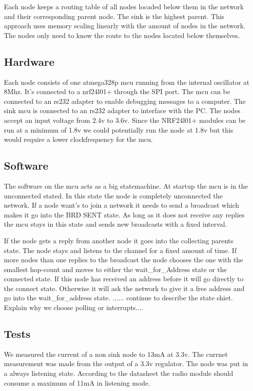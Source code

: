 \documentclass[a4paper,11pt]{article}
\begin{document}
Each node keeps a routing table of all nodes locaded below them in the
network and their corresponding parent node. The sink is the highest
parent. This approach uses memory scaling linearly with the amount of
nodes in the network. The nodes only need to know the route to the
nodes located below themselves.

\subsection{Hardware}
Each node consists of one atmega328p mcu running from the
internal oscillator at 8Mhz. It's connected to a nrf24l01+ through the
SPI port. The mcu can be connected to an rs232 adapter to enable
debugging messages to a computer. The sink mcu is connected to an
rs232 adapter to interface with the PC. The nodes accept an input
voltage from 2.4v to 3.6v. Since the NRF24l01+ modules can be run at a
minimum of 1.8v we could potentially run the node at 1.8v but this
would require a lower clockfrequency for the mcu.



\subsection{Software}
The software on the mcu acts as a big statemachine. At startup the mcu
is in the unconnected stated. In this state the node is completely
unconnected the network. If a node want's to join a network it needs
to send a broadcast which makes it go into the BRD SENT state. As long
as it does not receive any replies the mcu stays in this state and
sends new broadcasts with a fixed interval.

If the node gets a reply from another node it goes into the
collecting parents state. The node stays and listens to the channel for
a fixed amount of time. If more nodes than one replies to the
broadcast the node chooses the one with the smallest hop-count and moves to
either the wait_for_Address state or the connected state.  If this
node has received an address before it will go directly to the connect
state. Otherwise it will ask the network to give it a free address and
go into the wait_for_address state.  ...... continue to describe the
state shiet. Explain why we choose polling or interrupts....


\subsection{Tests}
We measured the current of a non sink node to 13mA at 3.3v. The
currnet measurement was made from the output of a 3.3v regulator. 
The node was put in a always listening state. According to the 
datasheet the radio module should consume a maximum of 11mA in
listening mode.
\end{document}
